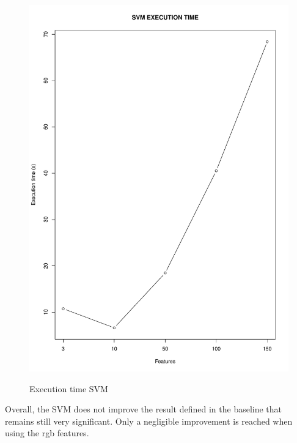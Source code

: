 \documentclass{article}
\begin{document}
\begin{figure}[H]
\begin{adjustwidth}{-4cm}{-4cm}
{    \includegraphics[scale=0.3]{../svm_time_rgb.pdf}  
     }
     \centering
     \caption{Execution time SVM}  \label{svm time} 
      \end{adjustwidth}
   \end{figure}
\noindent Overall, the SVM does not improve the result defined in the baseline that remains still very significant. Only a negligible improvement is reached when using the rgb features. \\
\end{document}
